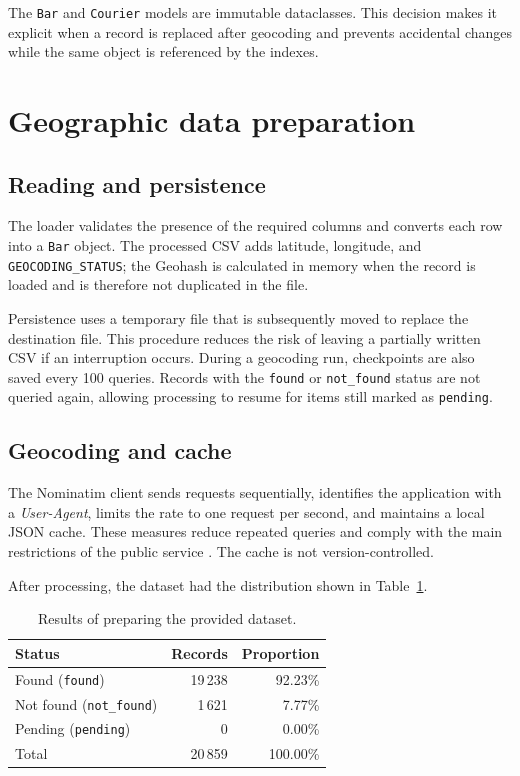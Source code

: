 \documentclass[12pt,a4paper]{article}
\begin{document}
The \texttt{Bar} and \texttt{Courier} models are immutable dataclasses. This
decision makes it explicit when a record is replaced after geocoding and
prevents accidental changes while the same object is referenced by the indexes.

\section{Geographic data preparation}

\subsection{Reading and persistence}

The loader validates the presence of the required columns and converts each row
into a \texttt{Bar} object. The processed CSV adds latitude, longitude, and
\texttt{GEOCODING\_STATUS}; the Geohash is calculated in memory when the record
is loaded and is therefore not duplicated in the file.

Persistence uses a temporary file that is subsequently moved to replace the
destination file.
This procedure reduces the risk of leaving a partially written CSV if an
interruption occurs. During a geocoding run, checkpoints are also saved every
100 queries. Records with the \texttt{found} or \texttt{not\_found} status are
not queried again, allowing processing to resume for items still marked as
\texttt{pending}.

\subsection{Geocoding and cache}

The Nominatim client sends requests sequentially, identifies the application
with a \emph{User-Agent}, limits the rate to one request per second, and
maintains a local JSON cache. These measures reduce repeated queries and comply
with the main restrictions of the public service \cite{nominatim-policy}. The
cache is not version-controlled.

After processing, the dataset had the distribution shown in
Table~\ref{tab:geocoding}.

\begin{table}[htbp]
\centering
\caption{Results of preparing the provided dataset.}
\label{tab:geocoding}
\begin{tabular}{@{}lrr@{}}
\toprule
Status & Records & Proportion \\
\midrule
Found (\texttt{found}) & 19\,238 & 92.23\% \\
Not found (\texttt{not\_found}) & 1\,621 & 7.77\% \\
Pending (\texttt{pending}) & 0 & 0.00\% \\
\midrule
Total & 20\,859 & 100.00\% \\
\bottomrule
\end{tabular}
\end{table}
\end{document}
